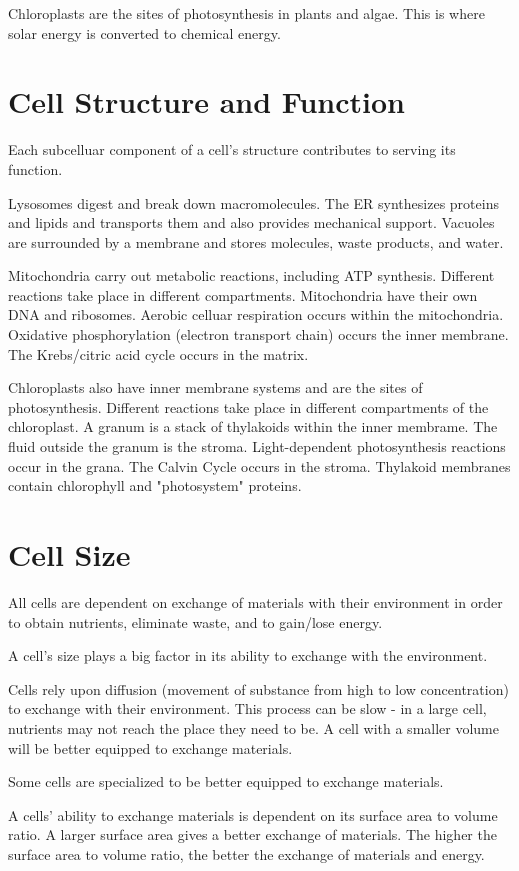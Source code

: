 \documentclass[../bio.tex]{subfiles}
\begin{document}
Chloroplasts are the sites of photosynthesis in plants and algae. This is where solar energy is converted to chemical energy.
\section{Cell Structure and Function}
Each subcelluar component of a cell's structure contributes to serving its function.

Lysosomes digest and break down macromolecules. The ER synthesizes proteins and lipids and transports them and also provides mechanical support. Vacuoles are surrounded by a membrane and stores molecules, waste products, and water.

Mitochondria carry out metabolic reactions, including ATP synthesis. Different reactions take place in different compartments. Mitochondria have their own DNA and ribosomes. Aerobic celluar respiration occurs within the mitochondria. Oxidative phosphorylation (electron transport chain) occurs the inner membrane. The Krebs/citric acid cycle occurs in the matrix. 

Chloroplasts also have inner membrane systems and are the sites of photosynthesis. Different reactions take place in different compartments of the chloroplast. A granum is a stack of thylakoids within the inner membrame. The fluid outside the granum is the stroma. Light-dependent photosynthesis reactions occur in the grana. The Calvin Cycle occurs in the stroma. Thylakoid membranes contain chlorophyll and "photosystem" proteins.
\section{Cell Size}
All cells are dependent on exchange of materials with their environment in order to obtain nutrients, eliminate waste, and to gain/lose energy. 

A cell's size plays a big factor in its ability to exchange with the environment.

Cells rely upon diffusion (movement of substance from high to low concentration) to exchange with their environment. This process can be slow - in a large cell, nutrients may not reach the place they need to be. A cell with a smaller volume will be better equipped to exchange materials. 

Some cells are specialized to be better equipped to exchange materials. 

A cells' ability to exchange materials is dependent on its surface area to volume ratio. A larger surface area gives a better exchange of materials. The higher the surface area to volume ratio, the better the exchange of materials and energy.
\end{document}
